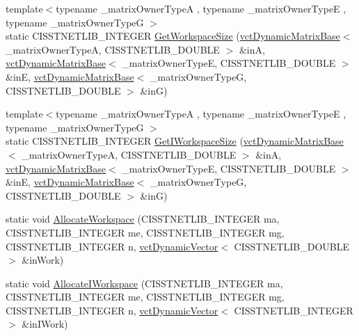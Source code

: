 \begin{DoxyCompactItemize}
\item 
{\footnotesize template$<$typename \+\_\+matrix\+Owner\+Type\+A , typename \+\_\+matrix\+Owner\+Type\+E , typename \+\_\+matrix\+Owner\+Type\+G $>$ }\\static C\+I\+S\+S\+T\+N\+E\+T\+L\+I\+B\+\_\+\+I\+N\+T\+E\+G\+E\+R \hyperlink{classnmr_l_sq_lin_solution_dynamic_a8cdae71d9dbcc8e12eada7da02a21f31}{Get\+Workspace\+Size} (\hyperlink{classvct_dynamic_matrix_base}{vct\+Dynamic\+Matrix\+Base}$<$ \+\_\+matrix\+Owner\+Type\+A, C\+I\+S\+S\+T\+N\+E\+T\+L\+I\+B\+\_\+\+D\+O\+U\+B\+L\+E $>$ \&in\+A, \hyperlink{classvct_dynamic_matrix_base}{vct\+Dynamic\+Matrix\+Base}$<$ \+\_\+matrix\+Owner\+Type\+E, C\+I\+S\+S\+T\+N\+E\+T\+L\+I\+B\+\_\+\+D\+O\+U\+B\+L\+E $>$ \&in\+E, \hyperlink{classvct_dynamic_matrix_base}{vct\+Dynamic\+Matrix\+Base}$<$ \+\_\+matrix\+Owner\+Type\+G, C\+I\+S\+S\+T\+N\+E\+T\+L\+I\+B\+\_\+\+D\+O\+U\+B\+L\+E $>$ \&in\+G)
\item 
{\footnotesize template$<$typename \+\_\+matrix\+Owner\+Type\+A , typename \+\_\+matrix\+Owner\+Type\+E , typename \+\_\+matrix\+Owner\+Type\+G $>$ }\\static C\+I\+S\+S\+T\+N\+E\+T\+L\+I\+B\+\_\+\+I\+N\+T\+E\+G\+E\+R \hyperlink{classnmr_l_sq_lin_solution_dynamic_aa5a262efd23844a2ac8d402fd250c0ee}{Get\+I\+Workspace\+Size} (\hyperlink{classvct_dynamic_matrix_base}{vct\+Dynamic\+Matrix\+Base}$<$ \+\_\+matrix\+Owner\+Type\+A, C\+I\+S\+S\+T\+N\+E\+T\+L\+I\+B\+\_\+\+D\+O\+U\+B\+L\+E $>$ \&in\+A, \hyperlink{classvct_dynamic_matrix_base}{vct\+Dynamic\+Matrix\+Base}$<$ \+\_\+matrix\+Owner\+Type\+E, C\+I\+S\+S\+T\+N\+E\+T\+L\+I\+B\+\_\+\+D\+O\+U\+B\+L\+E $>$ \&in\+E, \hyperlink{classvct_dynamic_matrix_base}{vct\+Dynamic\+Matrix\+Base}$<$ \+\_\+matrix\+Owner\+Type\+G, C\+I\+S\+S\+T\+N\+E\+T\+L\+I\+B\+\_\+\+D\+O\+U\+B\+L\+E $>$ \&in\+G)
\item 
static void \hyperlink{classnmr_l_sq_lin_solution_dynamic_acc868b744c8d40132279ecbf336c6587}{Allocate\+Workspace} (C\+I\+S\+S\+T\+N\+E\+T\+L\+I\+B\+\_\+\+I\+N\+T\+E\+G\+E\+R ma, C\+I\+S\+S\+T\+N\+E\+T\+L\+I\+B\+\_\+\+I\+N\+T\+E\+G\+E\+R me, C\+I\+S\+S\+T\+N\+E\+T\+L\+I\+B\+\_\+\+I\+N\+T\+E\+G\+E\+R mg, C\+I\+S\+S\+T\+N\+E\+T\+L\+I\+B\+\_\+\+I\+N\+T\+E\+G\+E\+R n, \hyperlink{classvct_dynamic_vector}{vct\+Dynamic\+Vector}$<$ C\+I\+S\+S\+T\+N\+E\+T\+L\+I\+B\+\_\+\+D\+O\+U\+B\+L\+E $>$ \&in\+Work)
\item 
static void \hyperlink{classnmr_l_sq_lin_solution_dynamic_a0fe27a44141dff5f06d220dc8ddf3c2d}{Allocate\+I\+Workspace} (C\+I\+S\+S\+T\+N\+E\+T\+L\+I\+B\+\_\+\+I\+N\+T\+E\+G\+E\+R ma, C\+I\+S\+S\+T\+N\+E\+T\+L\+I\+B\+\_\+\+I\+N\+T\+E\+G\+E\+R me, C\+I\+S\+S\+T\+N\+E\+T\+L\+I\+B\+\_\+\+I\+N\+T\+E\+G\+E\+R mg, C\+I\+S\+S\+T\+N\+E\+T\+L\+I\+B\+\_\+\+I\+N\+T\+E\+G\+E\+R n, \hyperlink{classvct_dynamic_vector}{vct\+Dynamic\+Vector}$<$ C\+I\+S\+S\+T\+N\+E\+T\+L\+I\+B\+\_\+\+I\+N\+T\+E\+G\+E\+R $>$ \&in\+I\+Work)

\end{DoxyCompactItemize}
